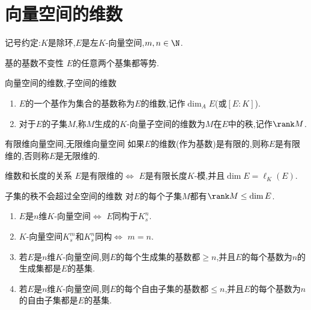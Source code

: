 \section{向量空间的维数}

记号约定:$K$是除环,$E$是左$K$-向量空间,$m,n\in\N$.

\begin{theorem}{基的基数不变性}{}
	$E$的任意两个基集都等势.
\end{theorem}

\begin{definition}{向量空间的维数,子空间的维数}{}
	\begin{enumerate}
		\item $E$的一个基作为集合的基数称为$E$的维数,记作$\dim_{A} E$(或$\left[E:K\right]$).
		\item 对于$E$的子集$M$,称$M$生成的$K$-向量子空间的维数为$M$在$E$中的秩,记作$\rank M$.
	\end{enumerate}
\end{definition}

\begin{definition}{有限维向量空间,无限维向量空间}{}
	如果$E$的维数(作为基数)是有限的,则称$E$是有限维的,否则称$E$是无限维的.
\end{definition}

\begin{remark}{维数和长度的关系}{}
	$E$是有限维的$\iff$ $E$是有限长度$K$-模,并且$\dim E=\ell_{K}\left(E\right)$.
\end{remark}

\begin{corollary}{子集的秩不会超过全空间的维数}{}
	对$E$的每个子集$M$都有$\rank M\leq\dim E$.
\end{corollary}

\begin{proposition}{}{}
	\begin{enumerate}
		\item $E$是$n$维$K$-向量空间$\iff$ $E$同构于$K_{s}^{n}$.
		\item $K$-向量空间$K_{s}^{m}$和$K_{s}^{n}$同构$\iff$ $m=n$.
		\item 若$E$是$n$维$K$-向量空间,则$E$的每个生成集的基数都$\geq n$,并且$E$的每个基数为$n$的生成集都是$E$的基集.
		\item 若$E$是$n$维$K$-向量空间,则$E$的每个自由子集的基数都$\leq n$,并且$E$的每个基数为$n$的自由子集都是$E$的基集.
	\end{enumerate}
\end{proposition}

